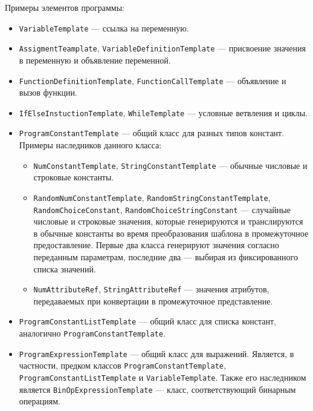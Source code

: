 Примеры элементов программы:
\begin{itemize}
    \item \texttt{VariableTemplate} --- ссылка на переменную.
    \item \texttt{AssigmentTeamplate}, \texttt{VariableDefinitionTemplate} ---
          присвоение значения в переменную и объявление переменной.
    \item \texttt{FunctionDefinitionTemplate}, \texttt{FunctionCallTemplate} ---
          объявление и вызов функции.
    \item \texttt{IfElseInstuctionTemplate}, \texttt{WhileTemplate} --- условные
          ветвления и циклы.
    \item \texttt{ProgramConstantTemplate} --- общий класс для разных типов констант. Примеры наследников
          данного класса:
          \begin{itemize}
              \item \texttt{NumConstantTemplate}, \texttt{StringConstantTemplate} ---
                    обычные числовые и строковые константы.
              \item \texttt{RandomNumConstantTemplate}, \texttt{RandomStringConstantTemplate},\\
                    \texttt{RandomChoiceConstant}, \texttt{RandomChoiceStringConstant}
                    --- случайные числовые и строковые значения, которые генерируются и транслируются
                    в обычные константы во время преобразования шаблона в промежуточное предоставление.
                    Первые два класса генерируют значения согласно переданным параметрам, последние два ---
                    выбирая из фиксированного списка значений.
              \item \texttt{NumAttributeRef}, \texttt{StringAttributeRef} --- значения атрибутов,
                    передаваемых при конвертации в промежуточное представление.
          \end{itemize}
    \item \texttt{ProgramConstantListTemplate} --- общий класс для списка констант, аналогично
          \texttt{ProgramConstantTemplate}.
    \item \texttt{ProgramExpressionTemplate} --- общий класс для выражений. Является,
          в частности, предком классов \texttt{ProgramConstantTemplate},\\ \texttt{ProgramConstantListTemplate}
          и \texttt{VariableTemplate}. Также его наследником является
          \texttt{BinOpExpressionTemplate} --- класс, соответствующий бинарным операциям.

\end{itemize}
